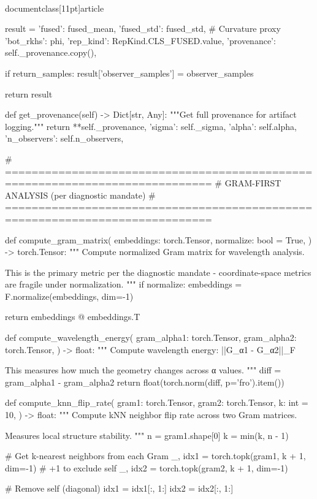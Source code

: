 \\documentclass[11pt]{article}
\begin{document}
\begin{CodeBlock}
        result = {
            'fused': fused_mean,
            'fused_std': fused_std,  # Curvature proxy
            'bot_rkhs': phi,
            'rep_kind': RepKind.CLS_FUSED.value,
            'provenance': self._provenance.copy(),
        }
        
        if return_samples:
            result['observer_samples'] = observer_samples
        
        return result
    
    def get_provenance(self) -> Dict[str, Any]:
        """Get full provenance for artifact logging."""
        return {
            **self._provenance,
            'sigma': self._sigma,
            'alpha': self.alpha,
            'n_observers': self.n_observers,
        }


# =============================================================================
# GRAM-FIRST ANALYSIS (per diagnostic mandate)
# =============================================================================

def compute_gram_matrix(
    embeddings: torch.Tensor,
    normalize: bool = True,
) -> torch.Tensor:
    """
    Compute normalized Gram matrix for wavelength analysis.
    
    This is the primary metric per the diagnostic mandate - 
    coordinate-space metrics are fragile under normalization.
    """
    if normalize:
        embeddings = F.normalize(embeddings, dim=-1)
    
    return embeddings @ embeddings.T


def compute_wavelength_energy(
    gram_alpha1: torch.Tensor,
    gram_alpha2: torch.Tensor,
) -> float:
    """
    Compute wavelength energy: ||G_α1 - G_α2||_F
    
    This measures how much the geometry changes across α values.
    """
    diff = gram_alpha1 - gram_alpha2
    return float(torch.norm(diff, p='fro').item())


def compute_knn_flip_rate(
    gram1: torch.Tensor,
    gram2: torch.Tensor,
    k: int = 10,
) -> float:
    """
    Compute kNN neighbor flip rate across two Gram matrices.
    
    Measures local structure stability.
    """
    n = gram1.shape[0]
    k = min(k, n - 1)
    
    # Get k-nearest neighbors from each Gram
    _, idx1 = torch.topk(gram1, k + 1, dim=-1)  # +1 to exclude self
    _, idx2 = torch.topk(gram2, k + 1, dim=-1)
    
    # Remove self (diagonal)
    idx1 = idx1[:, 1:]
    idx2 = idx2[:, 1:]
    

\end{CodeBlock}
\end{document}
